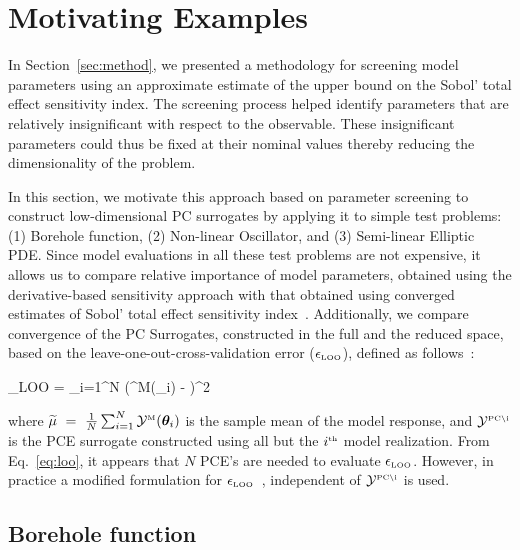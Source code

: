\section{Motivating Examples}
\label{sec:examples}

In Section~\ref{sec:method}, we presented a methodology for screening model
parameters using an approximate estimate of the upper bound on the Sobol'
total effect sensitivity index. The screening process helped identify parameters
that are relatively insignificant with respect to the observable. These insignificant
parameters could thus be fixed at their nominal values thereby reducing the
dimensionality of the problem. 

In this section, we motivate this approach based
on parameter screening to construct low-dimensional PC surrogates by 
applying it to simple test problems: (1) Borehole function, (2) Non-linear Oscillator, and
(3) Semi-linear Elliptic PDE. Since model evaluations in all these test
problems are not expensive, it allows us to compare relative importance of
model parameters,
obtained using the derivative-based sensitivity approach with that obtained
using converged estimates of Sobol' total effect sensitivity index~\cite{Sobol:2001}.
Additionally, we compare convergence of the PC Surrogates, constructed in
the full and the reduced space, based on the 
leave-one-out-cross-validation error ($\epsilon_{\mbox{\tiny LOO}}$), defined
as follows~\cite{Blatman:2010}:

\be
\epsilon_{\mbox{\tiny LOO}} = 
{\sum_{i=1}^N
\left(^{\mbox{\tiny M}}(\bm{\theta}_i) - \widetilde{\mu}\right)^2}
\label{eq:loo}
\ee

\noindent where $\widetilde{\mu}~=~\frac{1}{N}\sum_{i=1}^N \mathcal{Y}^{\mbox{\tiny M}}(\bm{\theta}_i)$
is the sample mean of the model response, and $ \mathcal{Y}^{\mbox{\tiny {PC}\textbackslash i}}$
is the PCE surrogate constructed using all but the $i^{\mbox{\tiny{th}}}$ model realization. 
From Eq.~\ref{eq:loo}, it appears that $N$ PCE's are needed to evaluate $\epsilon_{\mbox{\tiny LOO}}$.
However, in practice a modified formulation for $\epsilon_{\mbox{\tiny LOO}}$~\cite{Blatman:2009},
independent of $\mathcal{Y}^{\mbox{\tiny {PC}\textbackslash i}}$ is used.

\subsection{Borehole function}

